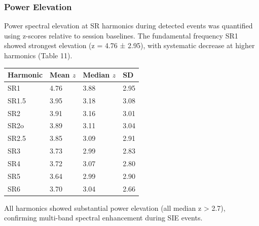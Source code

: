\documentclass[11pt,a4paper]{article}
\begin{document}
\subsubsection{Power Elevation}
Power spectral elevation at SR harmonics during detected events was quantified using z-scores relative to session baselines. The fundamental frequency SR1 showed strongest elevation (z = 4.76 ± 2.95), with systematic decrease at higher harmonics (Table 11).
\begin{table}[H]
    \centering
    \begin{tabular}{llll}
        \toprule
        Harmonic & Mean $z$ & Median $z$ & SD \\
        \midrule
        SR1 & 4.76 & 3.88 & 2.95 \\
        SR1.5 & 3.95 & 3.18 & 3.08 \\
        SR2 & 3.91 & 3.16 & 3.01 \\
        SR2o & 3.89 & 3.11 & 3.04 \\
        SR2.5 & 3.85 & 3.09 & 2.91 \\
        SR3 & 3.73 & 2.99 & 2.83 \\
        SR4 & 3.72 & 3.07 & 2.80 \\
        SR5 & 3.64 & 2.99 & 2.90 \\
        SR6 & 3.70 & 3.04 & 2.66 \\
        \bottomrule
    \end{tabular} \end{table}
All harmonics showed substantial power elevation (all median z > 2.7), confirming multi-band spectral enhancement during SIE events.
\end{document}
